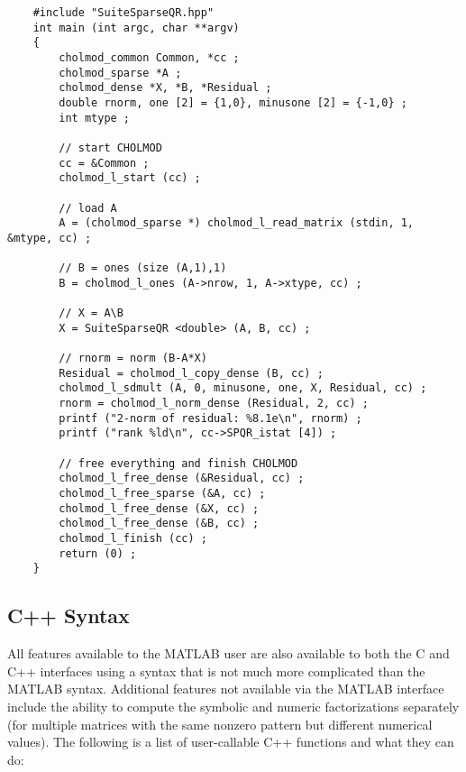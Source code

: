 \documentclass[12pt]{article}
\begin{document}
{\footnotesize
\begin{verbatim}
    #include "SuiteSparseQR.hpp"
    int main (int argc, char **argv)
    {
        cholmod_common Common, *cc ;
        cholmod_sparse *A ;
        cholmod_dense *X, *B, *Residual ;
        double rnorm, one [2] = {1,0}, minusone [2] = {-1,0} ;
        int mtype ;

        // start CHOLMOD
        cc = &Common ;
        cholmod_l_start (cc) ;

        // load A
        A = (cholmod_sparse *) cholmod_l_read_matrix (stdin, 1, &mtype, cc) ;

        // B = ones (size (A,1),1)
        B = cholmod_l_ones (A->nrow, 1, A->xtype, cc) ;

        // X = A\B
        X = SuiteSparseQR <double> (A, B, cc) ;

        // rnorm = norm (B-A*X)
        Residual = cholmod_l_copy_dense (B, cc) ;
        cholmod_l_sdmult (A, 0, minusone, one, X, Residual, cc) ;
        rnorm = cholmod_l_norm_dense (Residual, 2, cc) ;
        printf ("2-norm of residual: %8.1e\n", rnorm) ;
        printf ("rank %ld\n", cc->SPQR_istat [4]) ;

        // free everything and finish CHOLMOD
        cholmod_l_free_dense (&Residual, cc) ;
        cholmod_l_free_sparse (&A, cc) ;
        cholmod_l_free_dense (&X, cc) ;
        cholmod_l_free_dense (&B, cc) ;
        cholmod_l_finish (cc) ;
        return (0) ;
    }
\end{verbatim}
}

\subsection{C++ Syntax}

All features available to the MATLAB user are also available to both the C and
C++ interfaces using a syntax that is not much more complicated than the MATLAB
syntax.  Additional features not available via the MATLAB interface include the
ability to compute the symbolic and numeric factorizations separately (for
multiple matrices with the same nonzero pattern but different numerical
values).  The following is a list of user-callable C++ functions and what they
can do:
\end{document}
